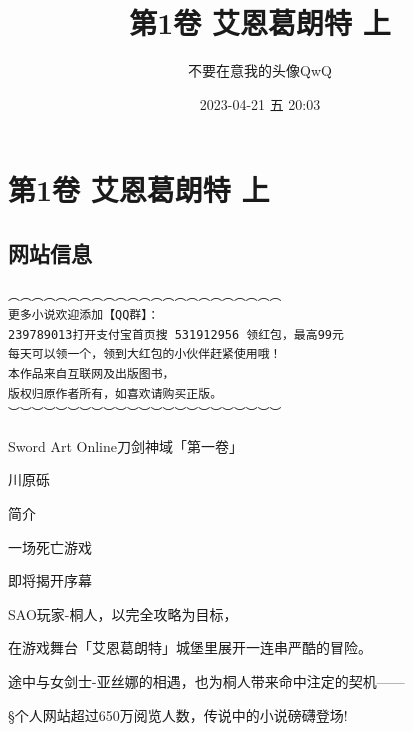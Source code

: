 \documentclass[11pt]{book}
\author{不要在意我的头像QwQ}
\date{2023-04-21 五 20:03}
\title{第1卷 艾恩葛朗特 上}
\begin{document}
\maketitle
\tableofcontents


\part{第1卷 艾恩葛朗特 上}
\label{sec:org3960687}
\chapter{网站信息}
\label{sec:org9f15cd6}
\begin{verbatim}
︵︵︵︵︵︵︵︵︵︵︵︵︵︵︵︵︵︵︵︵︵︵︵
更多小说欢迎添加【QQ群】：
239789013打开支付宝首页搜 531912956 领红包，最高99元
每天可以领一个，领到大红包的小伙伴赶紧使用哦！
本作品来自互联网及出版图书，
版权归原作者所有，如喜欢请购买正版。
︶︶︶︶︶︶︶︶︶︶︶︶︶︶︶︶︶︶︶︶︶︶︶
\end{verbatim}

Sword Art Online刀剑神域「第一卷」

川原砾
\begin{center}
简介

一场死亡游戏

即将揭开序幕

SAO玩家-桐人，以完全攻略为目标，

在游戏舞台「艾恩葛朗特」城堡里展开一连串严酷的冒险。

途中与女剑士-亚丝娜的相遇，也为桐人带来命中注定的契机——

§个人网站超过650万阅览人数，传说中的小说磅礴登场!
\end{center}
\end{document}
